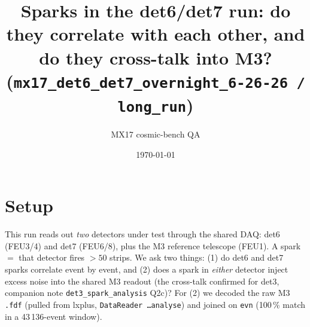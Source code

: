 \documentclass[11pt]{article}
\title{\vspace{-2.5em}Sparks in the det6/det7 run: do they correlate with each other,
and do they cross-talk into M3?\\\large (\texttt{mx17\_det6\_det7\_overnight\_6-26-26 /
long\_run})}
\author{MX17 cosmic-bench QA}
\date{\today}
\begin{document}
\maketitle
\vspace{-1.5em}

\section{Setup}
This run reads out \emph{two} detectors under test through the shared DAQ: det6 (FEU3/4)
and det7 (FEU6/8), plus the M3 reference telescope (FEU1). A spark $=$ that detector
fires $>50$ strips. We ask two things: (1) do det6 and det7 sparks correlate event by
event, and (2) does a spark in \emph{either} detector inject excess noise into the shared
M3 readout (the cross-talk confirmed for det3, companion note
\texttt{det3\_spark\_analysis} Q2c)? For (2) we decoded the raw M3 \texttt{.fdf} (pulled
from lxplus, \texttt{DataReader \dots analyse}) and joined on \texttt{evn} (100\,\% match
in a 43\,136-event window).
\end{document}

